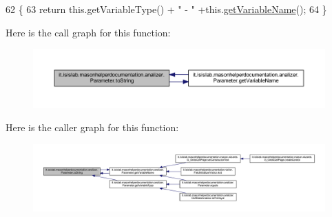 \begin{DoxyCode}
62                             \{
63         \textcolor{keywordflow}{return} this.getVariableType() + \textcolor{stringliteral}{" - "} +this.\hyperlink{classit_1_1isislab_1_1masonhelperdocumentation_1_1analizer_1_1_parameter_a90a9a8c551b6aa3b5a7502f6598ca4ef}{getVariableName}();
64     \}
\end{DoxyCode}


Here is the call graph for this function\-:\nopagebreak
\begin{figure}[H]
\begin{center}
\leavevmode
\includegraphics[width=350pt]{classit_1_1isislab_1_1masonhelperdocumentation_1_1analizer_1_1_parameter_a160bdfaa76ebdd6345cad2c751ffa834_cgraph}
\end{center}
\end{figure}




Here is the caller graph for this function\-:\nopagebreak
\begin{figure}[H]
\begin{center}
\leavevmode
\includegraphics[width=350pt]{classit_1_1isislab_1_1masonhelperdocumentation_1_1analizer_1_1_parameter_a160bdfaa76ebdd6345cad2c751ffa834_icgraph}
\end{center}
\end{figure}




